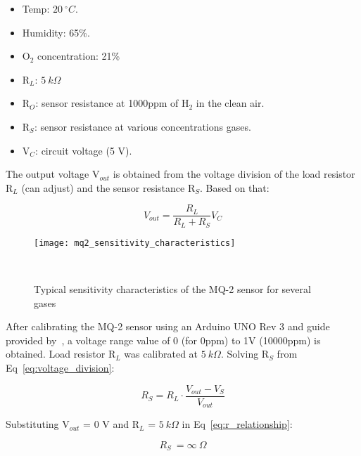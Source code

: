 \begin{itemize}
    \item Temp: $20~^{\circ}C$.

    \item Humidity: 65\%.

    \item O$_{2}$ concentration: 21\%

    \item R$_{L}$: $5~k\Omega$

    \item R$_{O}$: sensor resistance at 1000ppm of H$_{2}$ in the clean air.

    \item R$_{S}$: sensor resistance at various concentrations gases.

    \item V$_{C}$: circuit voltage (5 V). \\
\end{itemize}

The output voltage V$_{out}$ is obtained from the voltage division of the load resistor R$_{L}$ (can adjust) and the sensor resistance R$_{S}$. Based on that:

\begin{equation}
    V_{out} = \frac{R_{L}}{R_{L} + R_{S}} V_{C}
    \label{eq:voltage_division}
\end{equation}

\begin{figure}[H]
    \centering
    \texttt{[image: mq2\_sensitivity\_characteristics]}
    \caption{Typical sensitivity characteristics of the MQ-2 sensor for several gases}
~\label{fig:mq2_sensitivity_characteristics}
\end{figure}

After calibrating the MQ-2 sensor using an Arduino UNO Rev 3 and guide provided by~\cite{grove_2023}, a voltage range value of 0 (for 0ppm) to 1V (10000ppm) is obtained. Load resistor R$_{L}$ was calibrated at $5~k\Omega$. Solving R$_{S}$ from Eq~\ref{eq:voltage_division}:

\begin{equation}
    R_{S} = R_{L} \cdot \frac{V_{out} - V_{S}}{V_{out}}
    \label{eq:r_relationship}
\end{equation}

Substituting V$_{out}$ = 0 V and R$_{L}$ = $5~k\Omega$ in Eq~\ref{eq:r_relationship}:

\begin{equation}
    R_{S} ~= \infty~\Omega
    \label{eq:rs_at_0v}
\end{equation}

